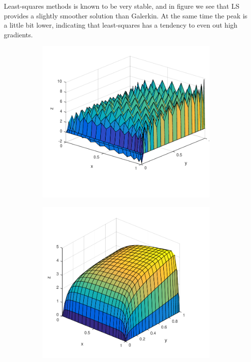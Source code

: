 %
Least-squares methods is known to be very stable, and in figure we see that LS provides a slightly smoother solution than Galerkin. At the same time the peak is a little bit lower, indicating that least-squares has a tendency to even out high gradients.  
%
\begin{figure}[h]
  \centering
  \begin{subfigure}[b]{0.48\textwidth}
	\includegraphics[width=\textwidth]{Figures/Spec_difftrans_aPos.pdf}
  \end{subfigure}%
  \quad
  \begin{subfigure}[b]{0.48\textwidth}
	\includegraphics[width=\textwidth]{Figures/SpecGLS_difftrans_aPos.pdf}

\end{subfigure}
\end{figure}
